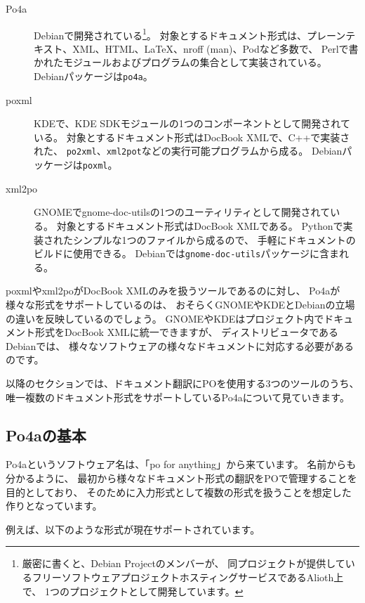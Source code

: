 \documentclass[mingoth,a4paper]{jsarticle}
\begin{document}
\begin{description}
 \item[Po4a] Debianで開発されている\footnote{厳密に書くと、Debian Projectのメンバーが、
	    同プロジェクトが提供しているフリーソフトウェアプロジェクトホスティングサービスであるAlioth上で、
	    1つのプロジェクトとして開発しています。}。
	    対象とするドキュメント形式は、プレーンテキスト、XML、HTML、LaTeX、nroff (man)、Podなど多数で、
	    Perlで書かれたモジュールおよびプログラムの集合として実装されている。
	    Debianパッケージは\texttt{po4a}。
 \item[poxml] KDEで、KDE SDKモジュールの1つのコンポーネントとして開発されている。
	    対象とするドキュメント形式はDocBook XMLで、C++で実装された、
	    \texttt{po2xml}、\texttt{xml2pot}などの実行可能プログラムから成る。
	    Debianパッケージは\texttt{poxml}。
 \item[xml2po] GNOMEでgnome-doc-utilsの1つのユーティリティとして開発されている。
	    対象とするドキュメント形式はDocBook XMLである。
	    Pythonで実装されたシンプルな1つのファイルから成るので、
	    手軽にドキュメントのビルドに使用できる。
	    Debianでは\texttt{gnome-doc-utils}パッケージに含まれる。
\end{description}

poxmlやxml2poがDocBook XMLのみを扱うツールであるのに対し、
Po4aが様々な形式をサポートしているのは、
おそらくGNOMEやKDEとDebianの立場の違いを反映しているのでしょう。
GNOMEやKDEはプロジェクト内でドキュメント形式をDocBook XMLに統一できますが、
ディストリビュータであるDebianでは、
様々なソフトウェアの様々なドキュメントに対応する必要があるのです。

以降のセクションでは、ドキュメント翻訳にPOを使用する3つのツールのうち、
唯一複数のドキュメント形式をサポートしているPo4aについて見ていきます。

\subsection{Po4aの基本}

Po4aというソフトウェア名は、「po for anything」から来ています。
名前からも分かるように、
最初から様々なドキュメント形式の翻訳をPOで管理することを目的としており、
そのために入力形式として複数の形式を扱うことを想定した作りとなっています。

例えば、以下のような形式が現在サポートされています。
\end{document}
